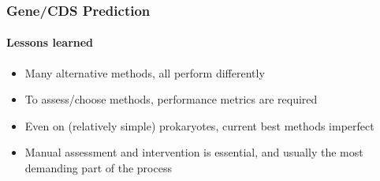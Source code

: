 \begin{frame}
   \frametitle{Gene/CDS Prediction}   
   \framesubtitle{Lessons learned}   
   \begin{itemize}
     \item Many alternative methods, all perform differently
     \item To assess/choose methods, performance metrics are required
     \item Even on (relatively simple) prokaryotes, current best methods imperfect
     \item Manual assessment and intervention is essential, and usually the most demanding part of the process
   \end{itemize}
\end{frame}
